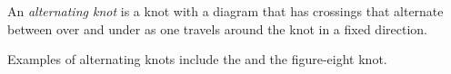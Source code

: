 \documentclass[12pt]{article}
\begin{document}
An \emph{alternating knot} is a knot with a diagram that has crossings that
alternate between over and under as one travels around the knot in a fixed
direction.

Examples of alternating knots include the  and the figure-eight knot.


\end{document}
